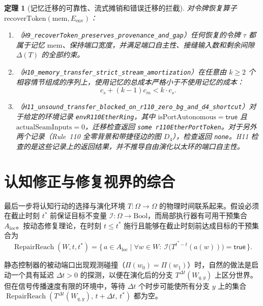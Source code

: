 \documentclass[11pt,a4paper]{article}
\theoremstyle{cleanthm}
\newtheorem{theorem}{定理}[section]
\theoremstyle{cleandef}
\DeclareMathOperator{\RepairReach}{RepairReach}
\begin{document}
\begin{theorem}[记忆迁移的可靠性、流式摊销和错误迁移的拦截]
\label{thm:h9_h11_memory}
对令牌恢复算子 $\mathrm{recoverToken}(\mathrm{mem}, E_{\mathrm{env}})$：
\begin{enumerate}
  \item （\texttt{H9\_recoverToken\_\allowbreak preserves\_\allowbreak provenance\_\allowbreak and\_\allowbreak gap}）任何恢复的令牌 $\tau$ 都属于记忆 $\mathrm{mem}$、保持端口宽度，并满足端口自主性、接缝输入数和剩余间隙 $\Delta(T)$ 的全部约束。
  \item （\texttt{H10\_memory\_\allowbreak transfer\_\allowbreak strict\_\allowbreak stream\_\allowbreak amortization}）在任意由 $k\ge 2$ 个相容情节组成的序列上，使用记忆的总成本严格小于不使用记忆的成本：
  \begin{equation}
    c_s + (k-1)c_m < k\cdot c_s.
  \end{equation}
  \item （\texttt{H11\_unsound\_\allowbreak transfer\_\allowbreak blocked\_\allowbreak on\_\allowbreak r110\_\allowbreak zero\_\allowbreak bg\_\allowbreak and\_\allowbreak d4\_\allowbreak shortcut}）对于给定的环境记录 \texttt{envR110EtherRing}，其中 $\mathrm{isPortAutonomous}=\mathsf{true}$ 且 $\mathrm{actualSeamInputs}=0$，迁移检查返回 \texttt{some r110EtherPortToken}。对于另外两个记录（Rule~110 全零背景和带捷径边的图 $D_4$），检查返回 \texttt{none}。H11 检查的是这些记录上的返回结果，并不推导自由演化以太环的端口自主性。
\end{enumerate}
\end{theorem}

\section{认知修正与修复视界的综合}

最后一步将认知行动的选择与演化环境 $T:\Omega\to\Omega$ 的物理时间联系起来。假设必须在截止时刻 $t^*$ 前保证目标不变量 $\mathcal{I}:\Omega\to\mathrm{Bool}$，而局部执行器有可用干预集合 $A_{\mathrm{loc}}$。按动态修复理论，在时刻 $t\le t^*$ 施行且能够在截止时刻前达成目标的干预集合为
\begin{equation}
  \RepairReach(W,t,t^*) = \bigl\{\, a\in A_{\mathrm{loc}} \;\big|\; \forall w\in W:\ \mathcal{I}\bigl(T^{t^*-t}(a(w))\bigr)=\mathsf{true} \,\bigr\}.
\end{equation}

静态控制器的被动端口出现观测碰撞（$\Pi(w_0)=\Pi(w_1)$）时，自然的做法是启动一个具有延迟 $\Delta t>0$ 的探测，以便在演化后的分支 $T^{\Delta t}(W_{q,y})$ 上区分世界。但在信号传播速度有限的环境中，等待 $\Delta t$ 个时步可能使所有分支 $y$ 上的集合 $\RepairReach(T^{\Delta t}(W_{q,y}),\, t+\Delta t,\, t^*)$ 都为空。
\end{document}
